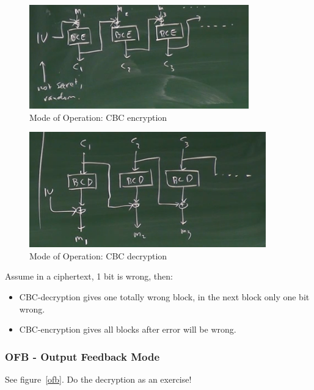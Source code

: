 \documentclass[language=english,number=]{homework}
\begin{document}
\begin{figure}
    \centering
    \includegraphics[width=\textwidth]{cbc.PNG}
    \caption{Mode of Operation: CBC encryption}
    \label{cbc}
\end{figure}

\begin{figure}
    \centering
    \includegraphics[width=\textwidth]{cbcdec.PNG}
    \caption{Mode of Operation: CBC decryption}
    \label{cbcdec}
\end{figure}

    Assume in a ciphertext, 1 bit is wrong, then:
    \begin{itemize}
        \item CBC-decryption gives one totally wrong block, in the next block only one bit wrong.
        \item CBC-encryption gives all blocks after error will be wrong.
    \end{itemize}

    \subsubsection{OFB - Output Feedback Mode}

    See figure~\ref{ofb}.
    Do the decryption as an exercise!
\end{document}
